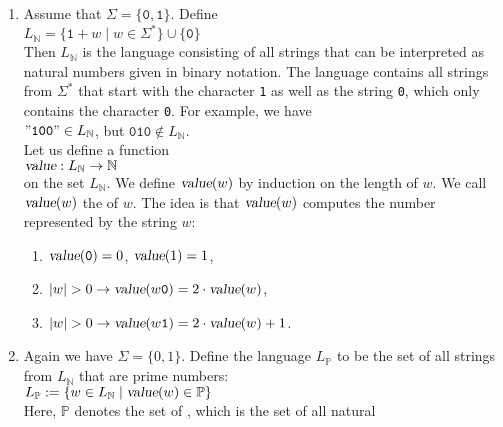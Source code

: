 \examplesEng
\begin{enumerate}
\item Assume that $\Sigma = \{\mathtt{0},\mathtt{1}\}$.  Define
      \\[0.2cm]
      \hspace*{1.3cm}
      $L_\mathbb{N} = \{ \mathtt{1}+w \mid w \in \Sigma^* \} \cup \{ \mathtt{0} \}$
      \\[0.2cm]
      Then $L_\mathbb{N}$ is the language consisting of all strings that can be interpreted as
      natural numbers given in binary notation.  The language contains all strings from $\Sigma^*$  that start with 
      the character \texttt{1} as well as the string \texttt{0}, which only contains the character
      \texttt{0}.  For example, we have
      \\[0.2cm]
      \hspace*{1.3cm}
      $\mathtt{\symbol{34}100\symbol{34}} \in L_\mathbb{N}$, \quad but \quad $\mathtt{010} \not\in L_\mathbb{N}$.
      \\[0.2cm]
      Let us define a function 
      \\[0.2cm]
      \hspace*{1.3cm}
      $\textsl{value}: L_\mathbb{N} \rightarrow \mathbb{N}$
      \\[0.2cm]
      on the set $L_\mathbb{N}$.  We define $\textsl{value}(w)$ by induction on the length of $w$.
      We call $\textsl{value}(w)$ the  of $w$.  The idea is that
      $\textsl{value}(w)$ computes the number represented by the string $w$:
      \begin{enumerate}
      \item $\textsl{value}(\mathtt{0}) = 0$, $\textsl{value}(1) = 1$,
      \item $|w| > 0 \rightarrow \textsl{value}(w\mathtt{0}) = 2 \cdot \textsl{value}(w)   $,
      \item $|w| > 0 \rightarrow \textsl{value}(w\mathtt{1}) = 2 \cdot \textsl{value}(w) + 1$.
      \end{enumerate}
\item Again we have $\Sigma = \{0,1\}$. Define the language $L_\mathbb{P}$
      to be the set of all strings from $L_\mathbb{N}$ that are prime numbers:
      \\[0.2cm]
      \hspace*{1.3cm}
      $L_\mathbb{P} := \{ w \in L_\mathbb{N} \mid \textsl{value}(w) \in \mathbb{P} \}$
      \\[0.2cm]
      Here, $\mathbb{P}$ denotes the set of ,  which is the set of all natural

\end{enumerate}

